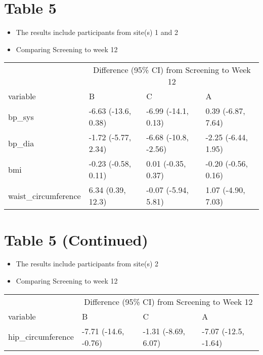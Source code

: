 \documentclass[]{article}
\providecommand{\tightlist}{%
  \setlength{\itemsep}{0pt}\setlength{\parskip}{0pt}}
\begin{document}
\hypertarget{table-5}{%
\section{Table 5}\label{table-5}}

\begin{itemize}
\tightlist
\item
  The results include participants from site(s) 1 and 2
\item
  Comparing Screening to week 12
\end{itemize}

\begin{table}[H]
\centering
\begin{tabular}{l|l|l|l}
\hline
\multicolumn{1}{c|}{ } & \multicolumn{3}{c}{Difference (95\% CI) from Screening to Week 12} \\
\cline{2-4}
variable & B & C & A\\
\hline
bp\_sys & -6.63 (-13.6, 0.38) & -6.99 (-14.1, 0.13) & 0.39 (-6.87, 7.64)\\
\hline
bp\_dia & -1.72 (-5.77, 2.34) & -6.68 (-10.8, -2.56) & -2.25 (-6.44, 1.95)\\
\hline
bmi & -0.23 (-0.58, 0.11) & 0.01 (-0.35, 0.37) & -0.20 (-0.56, 0.16)\\
\hline
waist\_circumference & 6.34 (0.39, 12.3) & -0.07 (-5.94, 5.81) & 1.07 (-4.90, 7.03)\\
\hline
\end{tabular}
\end{table}

\hypertarget{table-5-continued}{%
\section{Table 5 (Continued)}\label{table-5-continued}}

\begin{itemize}
\tightlist
\item
  The results include participants from site(s) 2
\item
  Comparing Screening to week 12
\end{itemize}

\begin{table}[H]
\centering
\begin{tabular}{l|l|l|l}
\hline
\multicolumn{1}{c|}{ } & \multicolumn{3}{c}{Difference (95\% CI) from Screening to Week 12} \\
\cline{2-4}
variable & B & C & A\\
\hline
hip\_circumference & -7.71 (-14.6, -0.76) & -1.31 (-8.69, 6.07) & -7.07 (-12.5, -1.64)\\
\hline
\end{tabular}
\end{table}
\end{document}
